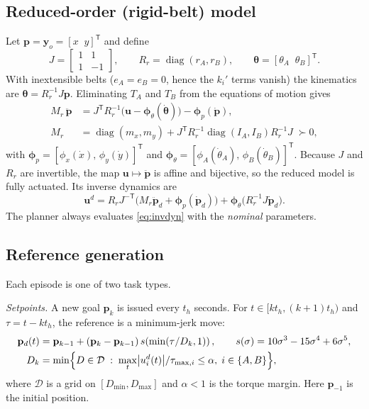 \subsection*{Reduced-order (rigid-belt) model}
Let $\mathbf{p} = \mathbf{y}_o = [x \;\; y]^{\mathsf T}$ and define
\begin{equation}
J = \begin{bmatrix} 1 & 1 \\ 1 & -1 \end{bmatrix}, \qquad
R_r = \operatorname{diag}(r_A, r_B), \qquad
\boldsymbol{\theta} = [\theta_A \;\; \theta_B]^{\mathsf T}.
\end{equation}
With inextensible belts ($e_A = e_B = 0$, hence the $k_i'$ terms vanish) the kinematics are
$\boldsymbol{\theta} = R_r^{-1} J \mathbf{p}$. Eliminating $T_A$ and $T_B$ from the equations of motion gives
\begin{align}
M_r\,\ddot{\mathbf{p}} &= J^{\mathsf T} R_r^{-1}
  \bigl(\mathbf{u} - \boldsymbol{\phi}_\theta(\dot{\boldsymbol{\theta}})\bigr)
  - \boldsymbol{\phi}_p(\dot{\mathbf{p}}), \\
M_r &= \operatorname{diag}(m_x, m_y)
  + J^{\mathsf T} R_r^{-1} \operatorname{diag}(I_A, I_B) R_r^{-1} J \;\succ 0,
\end{align}
with $\boldsymbol{\phi}_p = [\phi_x(\dot x),\, \phi_y(\dot y)]^{\mathsf T}$ and
$\boldsymbol{\phi}_\theta = [\phi_A(\dot\theta_A),\, \phi_B(\dot\theta_B)]^{\mathsf T}$.
Because $J$ and $R_r$ are invertible, the map $\mathbf{u} \mapsto \ddot{\mathbf{p}}$ is affine and bijective,
so the reduced model is fully actuated. Its inverse dynamics are
\begin{equation}
\mathbf{u}^{d} = R_r J^{-\mathsf T}\bigl(M_r \ddot{\mathbf{p}}_d + \boldsymbol{\phi}_p(\dot{\mathbf{p}}_d)\bigr)
  + \boldsymbol{\phi}_\theta\bigl(R_r^{-1} J \dot{\mathbf{p}}_d\bigr).
\label{eq:invdyn}
\end{equation}
The planner always evaluates \eqref{eq:invdyn} with the \emph{nominal} parameters.

\subsection*{Reference generation}
Each episode is one of two task types.

\emph{Setpoints.} A new goal $\mathbf{p}_k$ is issued every $t_h$ seconds.
For $t \in [k t_h, (k{+}1) t_h)$ and $\tau = t - k t_h$, the reference is a minimum-jerk move:
\begin{align}
\mathbf{p}_d(t) &= \mathbf{p}_{k-1} + (\mathbf{p}_k - \mathbf{p}_{k-1})\, s\!\left(\min(\tau / D_k, 1)\right),
\qquad s(\sigma) = 10\sigma^3 - 15\sigma^4 + 6\sigma^5, \\
D_k &= \min \Bigl\{ D \in \mathcal{D} \;:\;
  \max_{t} \bigl| u^{d}_i(t) \bigr| / \tau_{\max,i} \le \alpha, \; i \in \{A, B\} \Bigr\},
\end{align}
where $\mathcal{D}$ is a grid on $[D_{\min}, D_{\max}]$ and $\alpha < 1$ is the torque margin.
Here $\mathbf{p}_{-1}$ is the initial position.

